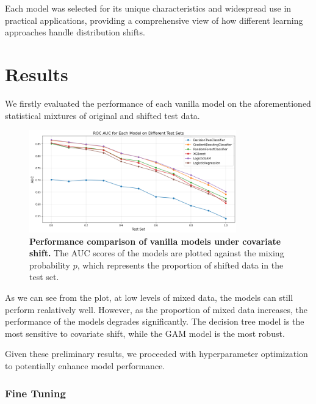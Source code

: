 Each model was selected for its unique characteristics and widespread use in practical applications, providing a comprehensive view of how different learning approaches handle distribution shifts.

\section{Results}

We firstly evaluated the performance of each vanilla model on the aforementioned statistical mixtures of original and shifted test data. 

\begin{figure}[H]
    \centering
    \includegraphics[width=0.8\textwidth]{assets/vanilla.png} 
    \caption{\textbf{Performance comparison of vanilla models under covariate shift.} The AUC scores of the models are plotted against the mixing probability $p$, which represents the proportion of shifted data in the test set.}
    \label{fig:vanilla-models-perf}
\end{figure}

As we can see from the plot, at low levels of mixed data, the models can still perform realatively well. However, as the proportion of mixed data increases, the performance of the models degrades significantly. The decision tree model is the most sensitive to covariate shift, while the GAM model is the most robust.

Given these preliminary results, we proceeded with hyperparameter optimization to potentially enhance model performance.

\subsubsection{Fine Tuning}

